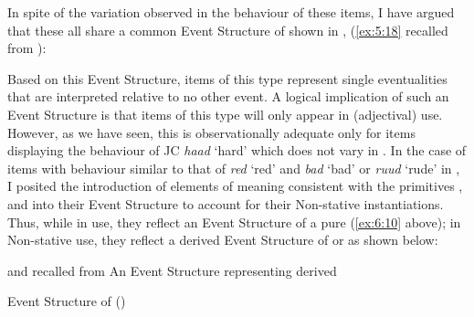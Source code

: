 In spite of the variation observed in the behaviour of these items, I have argued that these all share a common Event Structure of  shown in , (\ref{ex:5:18} recalled from ): 


Based on this Event Structure, items of this type represent single eventualities that are interpreted relative to no other event. A logical implication of such an Event Structure is that items of this type will only appear in  (adjectival) use. However, as we have seen, this is observationally adequate only for items displaying the behaviour of JC \textit{haad} `hard' which does not vary in . In the case of items with behaviour similar to that of \textit{red} `red' and \textit{bad} `bad' or \textit{ruud} `rude' in , I posited the introduction of elements of meaning consistent with the primitives \CAUSE, \BECOME and \DO into their Event Structure to account for their Non-stative instantiations. Thus, while in  use, they reflect an Event Structure of a pure  (\ref{ex:6:10} above); in Non-stative use, they reflect a derived Event Structure of  or  as shown below:

\ea%
 \label{ex:6:11}
 and  recalled from 
\ea An Event Structure representing derived 
\begin{center}
\end{center}\vspace{\baselineskip}
\ex
 Event Structure of  (\citealt[56]{Pustejovsky1991})\\ 
\begin{center}\fbox{\parbox{5cm}{\centering
\begin{forest}
[P
 [e$_1$,no edge]
 [~~...~~,roof]
 [e$_n$, no edge]
]
\end{forest}
}}\end{center}
\z
\z

